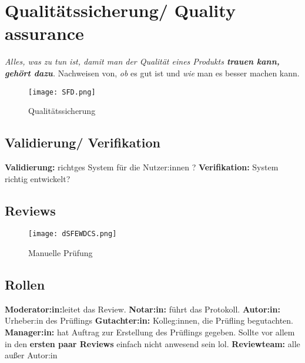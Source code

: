 \documentclass{book}
\begin{document}
    \section{Qualitätssicherung/ Quality assurance}
    \textit{Alles, was zu tun ist, damit man der Qualität eines
    Produkts \textbf{trauen kann, gehört dazu}.}
    \newline
    Nachweisen von, \textit{ob} es gut ist und \textit{wie} man es besser machen kann.
    \begin{figure}[H]
        \centering
        \texttt{[image: SFD.png]}
        \caption{Qualitätssicherung}
        \label{fig:enter-label}
    \end{figure}

    \subsection{Validierung/ Verifikation}
    \textbf{Validierung: } richtges System für die Nutzer:innen ? \newline
    \textbf{Verifikation:} System richtig entwickelt?

    \subsection{Reviews}
    \begin{figure}[H]
        \centering
        \texttt{[image: dSFEWDCS.png]}
        \caption{Manuelle Prüfung}
        \label{fig:enter-label}
    \end{figure}

    \subsection{Rollen}
    \textbf{Moderator:in:}leitet das Review.
    \newline
    \textbf{Notar:in:} führt das Protokoll. \newline
    \textbf{Autor:in:} Urheber:in des Prüflings \newline
    \textbf{Gutachter:in:} Kolleg:innen, die Prüfling begutachten. \newline
    \textbf{Manager:in:} hat Auftrag zur Erstellung des Prüflings gegeben. Sollte vor allem in den \textbf{ersten paar Reviews} einfach nicht anwesend sein lol. \newline
    \textbf{Reviewteam:} alle außer Autor:in
\end{document}
